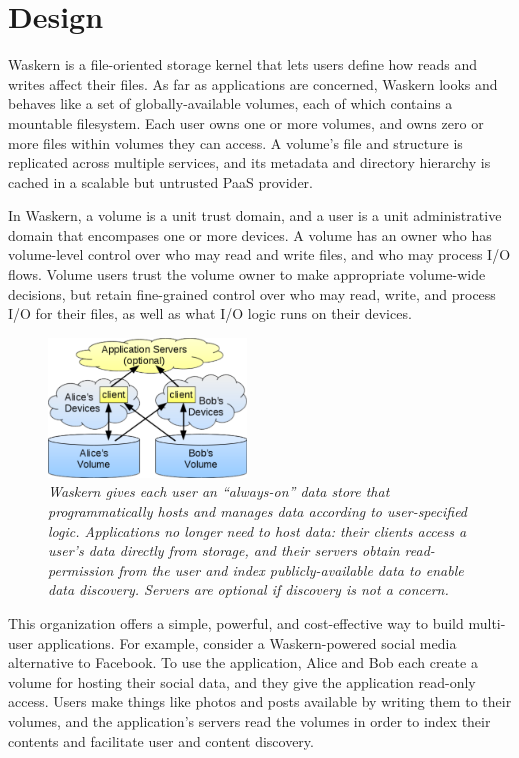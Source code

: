 \section{Design}
\label{sec:design}

Waskern is a file-oriented storage kernel that lets users define how reads and
writes affect their files.  As far as applications are concerned, Waskern looks
and behaves like a set of globally-available volumes, each of which contains a
mountable filesystem. Each user owns one or more volumes, and owns zero or more
files within volumes they can access.  A volume's file and structure is replicated across
multiple services, and its metadata and directory hierarchy is cached in a
scalable but untrusted PaaS provider.

In Waskern, a volume is a unit trust domain, and a user is a unit
administrative domain that encompases one or more devices.  A volume has an
owner who has volume-level control over who may read and write files, and who
may process I/O flows. Volume users trust the volume owner to make appropriate
volume-wide decisions, but retain fine-grained control over who may read, write,
and process I/O for their files, as well as what I/O logic runs on their
devices.

\begin{figure}[t!]
\centering
\includegraphics[width=0.47\textwidth]{figures/app-overview}
\caption{\it
Waskern gives each user an ``always-on'' data store that programmatically
hosts and manages data according to user-specified logic.  Applications no
longer need to host data:  their clients access a user's data directly from storage,
and their servers obtain read-permission from the user and
index publicly-available data to enable data discovery.  Servers are optional if
   discovery is not a concern.}
\label{fig:app-overview}
\end{figure}

This organization offers a simple, powerful, and cost-effective way to build multi-user
applications. For example, consider a Waskern-powered social media alternative
to Facebook. To use the application, Alice and Bob each create a volume for
hosting their social data, and they give the application read-only access. Users
make things like photos and posts available by writing them to their volumes,
and the application's servers read the volumes in order to index their
contents and facilitate user and content discovery.

